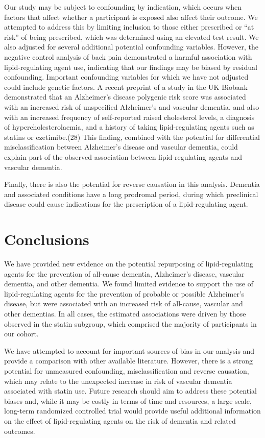 \documentclass[
]{article}
\begin{document}
Our study may be subject to confounding by indication, which occurs when factors that affect whether a participant is exposed also affect their outcome. We attempted to address this by limiting inclusion to those either prescribed or ``at risk'' of being prescribed, which was determined using an elevated test result. We also adjusted for several additional potential confounding variables. However, the negative control analysis of back pain demonstrated a harmful association with lipid-regulating agent use, indicating that our findings may be biased by residual confounding. Important confounding variables for which we have not adjusted could include genetic factors. A recent preprint of a study in the UK Biobank demonstrated that an Alzheimer's disease polygenic risk score was associated with an increased risk of unspecified Alzheimer's and vascular dementia, and also with an increased frequency of self-reported raised cholesterol levels, a diagnosis of hypercholesterolaemia, and a history of taking lipid-regulating agents such as statins or ezetimibe.(28) This finding, combined with the potential for differential misclassification between Alzheimer's disease and vascular dementia, could explain part of the observed association between lipid-regulating agents and vascular dementia.

Finally, there is also the potential for reverse causation in this analysis. Dementia and associated conditions have a long prodromal period, during which preclinical disease could cause indications for the prescription of a lipid-regulating agent.

\newpage

\hypertarget{conclusion}{%
\section{Conclusions}\label{conclusion}}

We have provided new evidence on the potential repurposing of lipid-regulating agents for the prevention of all-cause dementia, Alzheimer's disease, vascular dementia, and other dementia. We found limited evidence to support the use of lipid-regulating agents for the prevention of probable or possible Alzheimer's disease, but were associated with an increased risk of all-cause, vascular and other dementias. In all cases, the estimated associations were driven by those observed in the statin subgroup, which comprised the majority of participants in our cohort.

We have attempted to account for important sources of bias in our analysis and provide a comparison with other available literature. However, there is a strong potential for unmeasured confounding, misclassification and reverse causation, which may relate to the unexpected increase in risk of vascular dementia associated with statin use. Future research should aim to address these potential biases and, while it may be costly in terms of time and resources, a large scale, long-term randomized controlled trial would provide useful additional information on the effect of lipid-regulating agents on the risk of dementia and related outcomes.
\end{document}
